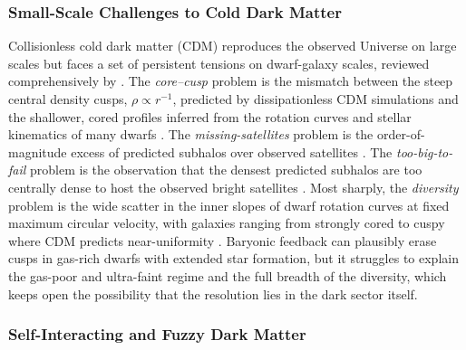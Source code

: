 \subsubsection{Small-Scale Challenges to Cold Dark Matter}

Collisionless cold dark matter (CDM) reproduces the observed Universe on large scales but faces a set of persistent tensions on dwarf-galaxy scales, reviewed comprehensively by \cite{bullock2017}. The \emph{core--cusp} problem is the mismatch between the steep central density cusps, $\rho\propto r^{-1}$, predicted by dissipationless CDM simulations and the shallower, cored profiles inferred from the rotation curves and stellar kinematics of many dwarfs \cite{deblok2010}. The \emph{missing-satellites} problem is the order-of-magnitude excess of predicted subhalos over observed satellites \cite{moore1999}. The \emph{too-big-to-fail} problem is the observation that the densest predicted subhalos are too centrally dense to host the observed bright satellites \cite{boylankolchin2011}. Most sharply, the \emph{diversity} problem is the wide scatter in the inner slopes of dwarf rotation curves at fixed maximum circular velocity, with galaxies ranging from strongly cored to cuspy where CDM predicts near-uniformity \cite{oman2015}. Baryonic feedback can plausibly erase cusps in gas-rich dwarfs with extended star formation, but it struggles to explain the gas-poor and ultra-faint regime and the full breadth of the diversity, which keeps open the possibility that the resolution lies in the dark sector itself.

\subsubsection{Self-Interacting and Fuzzy Dark Matter}

